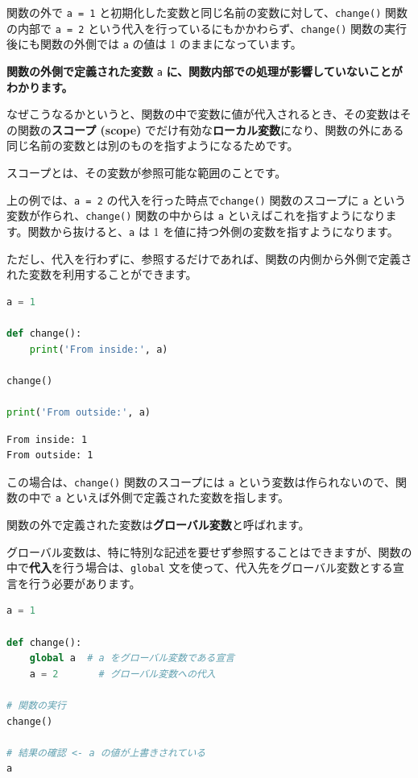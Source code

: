 関数の外で \texttt{a = 1} と初期化した変数と同じ名前の変数に対して、\texttt{change()} 関数の内部で \texttt{a = 2} という代入を行っているにもかかわらず、\texttt{change()} 関数の実行後にも関数の外側では \texttt{a} の値は 1 のままになっています。

\textbf{関数の外側で定義された変数} \texttt{a} \textbf{に、関数内部での処理が影響していないことがわかります。}


なぜこうなるかというと、関数の中で変数に値が代入されるとき、その変数はその関数の\textbf{スコープ (scope)} でだけ有効な\textbf{ローカル変数}になり、関数の外にある同じ名前の変数とは別のものを指すようになるためです。

スコープとは、その変数が参照可能な範囲のことです。

上の例では、\texttt{a = 2} の代入を行った時点で\texttt{change()} 関数のスコープに \texttt{a} という変数が作られ、\texttt{change()} 関数の中からは \texttt{a} といえばこれを指すようになります。関数から抜けると、\texttt{a} は 1 を値に持つ外側の変数を指すようになります。


ただし、代入を行わずに、参照するだけであれば、関数の内側から外側で定義された変数を利用することができます。


\begin{lstlisting}[style=codecell,language=Python]
a = 1

def change():
    print('From inside:', a)
    
change()

print('From outside:', a)
\end{lstlisting}

\begin{lstlisting}[style=outputcell]
From inside: 1
From outside: 1
\end{lstlisting}

この場合は、\texttt{change()} 関数のスコープには \texttt{a} という変数は作られないので、関数の中で \texttt{a} といえば外側で定義された変数を指します。


関数の外で定義された変数は\textbf{グローバル変数}と呼ばれます。

グローバル変数は、特に特別な記述を要せず参照することはできますが、関数の中で\textbf{代入}を行う場合は、\texttt{global} 文を使って、代入先をグローバル変数とする宣言を行う必要があります。


\begin{lstlisting}[style=codecell,language=Python]
a = 1

def change():
    global a  # a をグローバル変数である宣言
    a = 2       # グローバル変数への代入

# 関数の実行
change()

# 結果の確認 <- a の値が上書きされている
a
\end{lstlisting}

